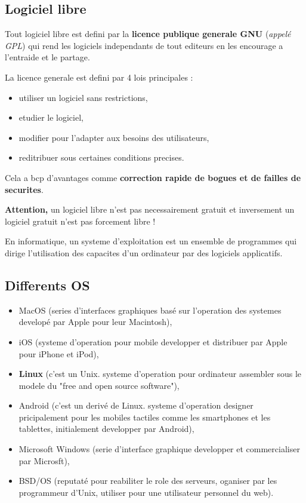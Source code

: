 
\subsection{Logiciel libre}

Tout logiciel libre est defini par la \textbf{licence publique generale GNU} (\textit{appelé GPL}) qui rend les logiciels independants de tout editeurs en les encourage a l'entraide et le partage.

La licence generale est defini par 4 lois principales :
\begin{itemize}
	\item utiliser un logiciel sans restrictions,
	\item etudier le logiciel,
	\item modifier pour l'adapter aux besoins des utilisateurs,
	\item reditribuer sous certaines conditions precises.
\end{itemize}
Cela a bcp d'avantages comme \textbf{correction rapide de bogues et de failles de securites}.

\textbf{Attention,} un logiciel libre n'est pas necessairement gratuit et inversement un logiciel gratuit n'est pas forcement libre ! \newpage


 

 
En informatique, un systeme d'exploitation est un ensemble de programmes qui dirige l'utilisation des capacites d'un ordinateur par des logiciels applicatifs.\newline


\subsection{Differents OS}
\begin{itemize}
\item MacOS (series d'interfaces graphiques basé sur l'operation des systemes developé par Apple pour leur Macintosh),
\item iOS (systeme d'operation pour mobile developper et distribuer par Apple pour iPhone et iPod),
\item \textbf{Linux} (c'est un Unix. systeme d'operation pour ordinateur assembler sous le modele du "free and open source software"),
\item Android (c'est un derivé de Linux. systeme d'operation designer pricipalement pour les mobiles tactiles comme les smartphones et les tablettes, initialement developper par Android),
\item Microsoft Windows (serie d'interface graphique developper et commercialiser par Microsft),
\item BSD/OS (reputaté pour reabiliter le role des serveurs, oganiser par les programmeur d'Unix, utiliser pour une utilisateur personnel du web).\newline
\end{itemize}


